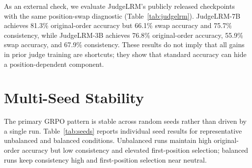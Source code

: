 \documentclass[letterpaper]{article}
\begin{document}
As an external check, we evaluate JudgeLRM's publicly released checkpoints~\citep{chen2025judgelrm} with the same position-swap diagnostic (Table~\ref{tab:judgelrm}). JudgeLRM-7B achieves 81.3\% original-order accuracy but 66.1\% swap accuracy and 75.7\% consistency, while JudgeLRM-3B achieves 76.8\% original-order accuracy, 55.9\% swap accuracy, and 67.9\% consistency. These results do not imply that all gains in prior judge training are shortcuts; they show that standard accuracy can hide a position-dependent component.

\begin{table}[htbp]
\centering
\scriptsize
\setlength{\tabcolsep}{2.5pt}
\caption{Published RL-trained judges also show a position-dependent component under the swap diagnostic. Bias is the always-first minus always-second inconsistent rate.}
\label{tab:judgelrm}
\end{table}

\section{Multi-Seed Stability}
\label{app:seeds}

The primary GRPO pattern is stable across random seeds rather than driven by a single run. Table~\ref{tab:seeds} reports individual seed results for representative unbalanced and balanced conditions. Unbalanced runs maintain high original-order accuracy but low consistency and elevated first-position selection; balanced runs keep consistency high and first-position selection near neutral.
\end{document}
